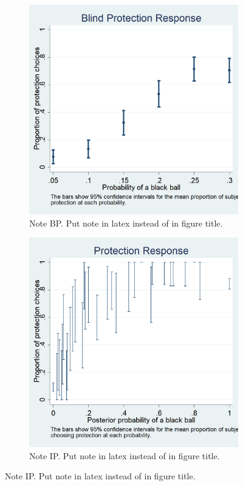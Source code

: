 \documentclass[12pt,a4paper]{article}
\begin{document}
\begin{figure}[H]
\centering
\caption{Average Protection Response} \label{fig:ProtResponse}
\begin{subfigure}[t]{.45\textwidth}
  \centering
\includegraphics[width=\textwidth]{Graphs/blind_prot_sta.png}
\caption{Note BP. Put note in latex instead of in figure title.}
\end{subfigure}
\begin{subfigure}[t]{.45\textwidth}
  \includegraphics[width=\textwidth]{Graphs/ip_response.png}
\caption{Note IP. Put note in latex instead of in figure title.}
\end{subfigure}
%
\end{figure}
\end{document}
